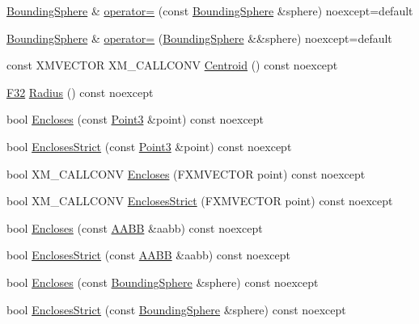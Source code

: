 \begin{DoxyCompactItemize}
\item 
\hyperlink{classmage_1_1_bounding_sphere}{Bounding\+Sphere} \& \hyperlink{classmage_1_1_bounding_sphere_ad8159156e4258d23afdb43e4a9104743}{operator=} (const \hyperlink{classmage_1_1_bounding_sphere}{Bounding\+Sphere} \&sphere) noexcept=default
\item 
\hyperlink{classmage_1_1_bounding_sphere}{Bounding\+Sphere} \& \hyperlink{classmage_1_1_bounding_sphere_a2a0e22660b37c54bb0e2e76efc198281}{operator=} (\hyperlink{classmage_1_1_bounding_sphere}{Bounding\+Sphere} \&\&sphere) noexcept=default
\item 
const X\+M\+V\+E\+C\+T\+OR X\+M\+\_\+\+C\+A\+L\+L\+C\+O\+NV \hyperlink{classmage_1_1_bounding_sphere_ae31660bd7333227d3f5e75b3243b8263}{Centroid} () const noexcept
\item 
\hyperlink{namespacemage_aa97e833b45f06d60a0a9c4fc22ae02c0}{F32} \hyperlink{classmage_1_1_bounding_sphere_a51c7e6db89c68d192961bfaf2114fb2f}{Radius} () const noexcept
\item 
bool \hyperlink{classmage_1_1_bounding_sphere_a7a6e27ec28a95caaef46f633b21af54e}{Encloses} (const \hyperlink{structmage_1_1_point3}{Point3} \&point) const noexcept
\item 
bool \hyperlink{classmage_1_1_bounding_sphere_a749a8fa3317e5490c12b049e68f7d502}{Encloses\+Strict} (const \hyperlink{structmage_1_1_point3}{Point3} \&point) const noexcept
\item 
bool X\+M\+\_\+\+C\+A\+L\+L\+C\+O\+NV \hyperlink{classmage_1_1_bounding_sphere_a5174af3edc1f3a5635df5395b54ae352}{Encloses} (F\+X\+M\+V\+E\+C\+T\+OR point) const noexcept
\item 
bool X\+M\+\_\+\+C\+A\+L\+L\+C\+O\+NV \hyperlink{classmage_1_1_bounding_sphere_ad75f41a261dd2e366457543b6150718a}{Encloses\+Strict} (F\+X\+M\+V\+E\+C\+T\+OR point) const noexcept
\item 
bool \hyperlink{classmage_1_1_bounding_sphere_a35feaaaf141319bdf37fca4da0ed0fc0}{Encloses} (const \hyperlink{classmage_1_1_a_a_b_b}{A\+A\+BB} \&aabb) const noexcept
\item 
bool \hyperlink{classmage_1_1_bounding_sphere_ac1598f0dcef439855f203fbd6357e6f7}{Encloses\+Strict} (const \hyperlink{classmage_1_1_a_a_b_b}{A\+A\+BB} \&aabb) const noexcept
\item 
bool \hyperlink{classmage_1_1_bounding_sphere_ac5989739e15d3525bbb805f9c457ad4d}{Encloses} (const \hyperlink{classmage_1_1_bounding_sphere}{Bounding\+Sphere} \&sphere) const noexcept
\item 
bool \hyperlink{classmage_1_1_bounding_sphere_a8f0fc134762fb9a00b47d62cc09c7703}{Encloses\+Strict} (const \hyperlink{classmage_1_1_bounding_sphere}{Bounding\+Sphere} \&sphere) const noexcept

\end{DoxyCompactItemize}

